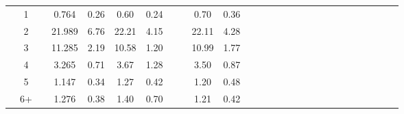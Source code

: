 \documentclass[a4paper 12pt]{article}
\numberwithin{equation}{section}
\begin{document}
\begin{tiny}
\begin{table}[h!]
\begin{tabular}{ccccccccccccccccccccccccccc}
\raisebox{1.5ex}{\bf saithe} & 1  & & 0.764  & 0.26 & 0.60  & 0.24  & & & 0.70 & 0.36  \\[1ex]
& 2 &  & 21.989 & 6.76  &  22.21 & 4.15 & & & 22.11& 4.28  \\[1ex]
& 3 &  & 11.285 & 2.19  &  10.58 & 1.20 & & & 10.99& 1.77  \\[1ex]
& 4 &  & 3.265  & 0.71  &  3.67  & 1.28 & & & 3.50 & 0.87  \\[1ex]
& 5 &  & 1.147  & 0.34  &  1.27  & 0.42 & & & 1.20 & 0.48  \\[1ex]
& 6+ &   & 1.276 & 0.38  &  1.40  & 0.70 & & & 1.21 & 0.42 \\[0.5ex]

\hline
\end{tabular}
\end{table}
\end{tiny}




\clearpage



\end{document}
